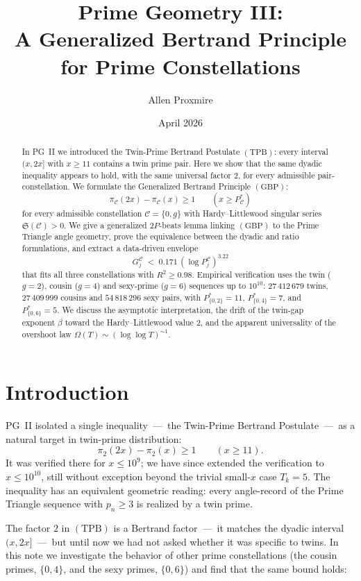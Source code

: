 \documentclass[11pt]{article}
\title{Prime Geometry III:\\
A Generalized Bertrand Principle for Prime Constellations}
\author{Allen Proxmire}
\date{April 2026}
\begin{document}
\maketitle

\begin{abstract}
In PG~II we introduced the Twin-Prime Bertrand Postulate
$(\mathrm{TPB})$: every interval $(x,2x]$ with $x\ge 11$ contains a
twin prime pair. Here we show that the same dyadic inequality
appears to hold, with the same universal factor $2$, for every
admissible pair-constellation. We formulate the Generalized Bertrand
Principle $(\mathrm{GBP})$:
\[
\pi_\mathcal{C}(2x)-\pi_\mathcal{C}(x)\ge 1\qquad(x\ge P^{*}_\mathcal{C})
\]
for every admissible constellation $\mathcal{C}=\{0,g\}$ with
Hardy--Littlewood singular series $\mathfrak{S}(\mathcal{C})>0$. We
give a generalized $2P$-beats lemma linking $(\mathrm{GBP})$ to the
Prime Triangle angle geometry, prove the equivalence between the
dyadic and ratio formulations, and extract a data-driven envelope
\[
G^{\mathcal{C}}_j \;<\; 0.171\,(\log P^{\mathcal{C}}_j)^{3.22}
\]
that fits all three constellations with $R^2\ge 0.98$. Empirical verification uses
the twin ($g=2$), cousin ($g=4$) and sexy-prime ($g=6$) sequences up
to $10^{10}$: $27\,412\,679$ twins, $27\,409\,999$ cousins and
$54\,818\,296$ sexy pairs, with $P^{*}_{\{0,2\}}=11$,
$P^{*}_{\{0,4\}}=7$, and $P^{*}_{\{0,6\}}=5$. We discuss the
asymptotic interpretation, the drift of the twin-gap exponent
$\beta$ toward the Hardy--Littlewood value $2$, and the apparent
universality of the overshoot law
$\Omega(T)\sim(\log\log T)^{\sim 1}$.
\end{abstract}

\section{Introduction}

PG~II isolated a single inequality~---~the Twin-Prime Bertrand
Postulate~---~as a natural target in twin-prime distribution:
\[
\pi_2(2x)-\pi_2(x)\ge 1\qquad(x\ge 11).
\]
It was verified there for $x\le 10^9$; we have since extended the
verification to $x\le 10^{10}$, still without exception beyond the
trivial small-$x$ case $T_k=5$. The inequality has an equivalent
geometric reading: every angle-record of the Prime Triangle sequence
with $p_n\ge 3$ is realized by a twin prime.

The factor $2$ in $(\mathrm{TPB})$ is a Bertrand factor~---~it matches
the dyadic interval $(x,2x]$~---~but until now we had not asked
whether it was specific to twins. In this note we investigate the
behavior of other prime constellations (the cousin primes,
$\{0,4\}$, and the sexy primes, $\{0,6\}$) and find that the same
bound holds:
\end{document}
